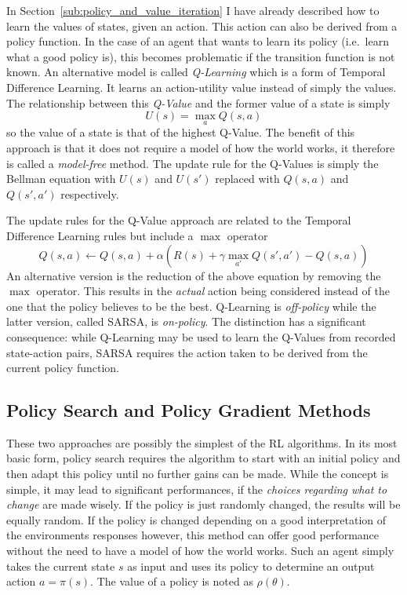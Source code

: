 In Section~\ref{sub:policy_and_value_iteration} I have already described how to learn the values of states, given an
action. This action can also be derived from a policy function.  In the case of an agent that wants to learn its policy
(i.e.\ learn what a good policy is), this becomes problematic if the transition function is not known. An alternative
model is called \emph{Q-Learning} which is a form of Temporal Difference Learning. It learns an action-utility value
instead of simply the values. The relationship between this \emph{Q-Value} and the former value of a state is simply
\begin{equation}
    U(s) = \max_{a}Q(s,a)
\end{equation}
so the value of a state is that of the highest Q-Value. The benefit of this approach is that it does not require a model
of how the world works, it therefore is called a \emph{model-free} method. The update rule for the Q-Values is simply
the Bellman equation with $U(s)$ and $U(s')$ replaced with $Q(s,a)$ and $Q(s',a')$ respectively.

The update rules for the Q-Value approach are related to the Temporal Difference Learning rules but include a $\max$
operator
\begin{equation}
    Q(s,a) \gets Q(s,a) + \alpha(R(s) + \gamma \max_{a'}Q(s', a') - Q(s,a))
\end{equation}
An alternative version is the reduction of the above equation by removing the $\max$ operator. This results in the
\emph{actual} action being considered instead of the one that the policy believes to be the best. Q-Learning is
\emph{off-policy} while the latter version, called \ac{SARSA}, is \emph{on-policy}. The distinction has a significant
consequence: while Q-Learning may be used to learn the Q-Values from recorded state-action pairs, \ac{SARSA} requires
the action taken to be derived from the current policy function.

\subsection{Policy Search and Policy Gradient Methods}%
\label{sub:policy_search_and_policy_gradient_methods}

These two approaches are possibly the simplest of the \ac{RL} algorithms. In its most basic form, policy search requires
the algorithm to start with an initial policy and then adapt this policy until no further gains can be made. While the
concept is simple, it may lead to significant performances, if the \emph{choices regarding what to change} are made
wisely. If the policy is just randomly changed, the results will be equally random. If the policy is changed depending
on a good interpretation of the environments responses however, this method can offer good performance without the need
to have a model of how the world works. Such an agent simply takes the current state $s$ as input and uses its policy to
determine an output action $a = \pi(s)$. The value of a policy is noted as $\rho(\theta)$.

